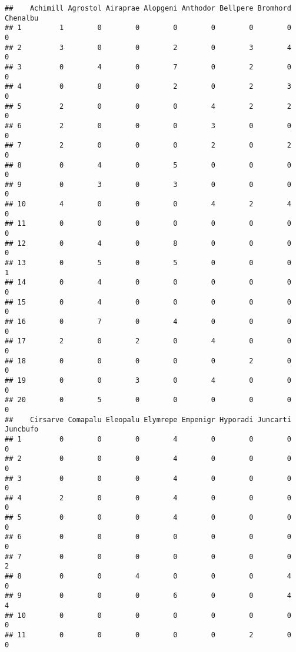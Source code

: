 \documentclass[
]{book}
\begin{document}
\begin{verbatim}
##    Achimill Agrostol Airaprae Alopgeni Anthodor Bellpere Bromhord Chenalbu
## 1         1        0        0        0        0        0        0        0
## 2         3        0        0        2        0        3        4        0
## 3         0        4        0        7        0        2        0        0
## 4         0        8        0        2        0        2        3        0
## 5         2        0        0        0        4        2        2        0
## 6         2        0        0        0        3        0        0        0
## 7         2        0        0        0        2        0        2        0
## 8         0        4        0        5        0        0        0        0
## 9         0        3        0        3        0        0        0        0
## 10        4        0        0        0        4        2        4        0
## 11        0        0        0        0        0        0        0        0
## 12        0        4        0        8        0        0        0        0
## 13        0        5        0        5        0        0        0        1
## 14        0        4        0        0        0        0        0        0
## 15        0        4        0        0        0        0        0        0
## 16        0        7        0        4        0        0        0        0
## 17        2        0        2        0        4        0        0        0
## 18        0        0        0        0        0        2        0        0
## 19        0        0        3        0        4        0        0        0
## 20        0        5        0        0        0        0        0        0
##    Cirsarve Comapalu Eleopalu Elymrepe Empenigr Hyporadi Juncarti Juncbufo
## 1         0        0        0        4        0        0        0        0
## 2         0        0        0        4        0        0        0        0
## 3         0        0        0        4        0        0        0        0
## 4         2        0        0        4        0        0        0        0
## 5         0        0        0        4        0        0        0        0
## 6         0        0        0        0        0        0        0        0
## 7         0        0        0        0        0        0        0        2
## 8         0        0        4        0        0        0        4        0
## 9         0        0        0        6        0        0        4        4
## 10        0        0        0        0        0        0        0        0
## 11        0        0        0        0        0        2        0        0

\end{verbatim}
\end{document}
